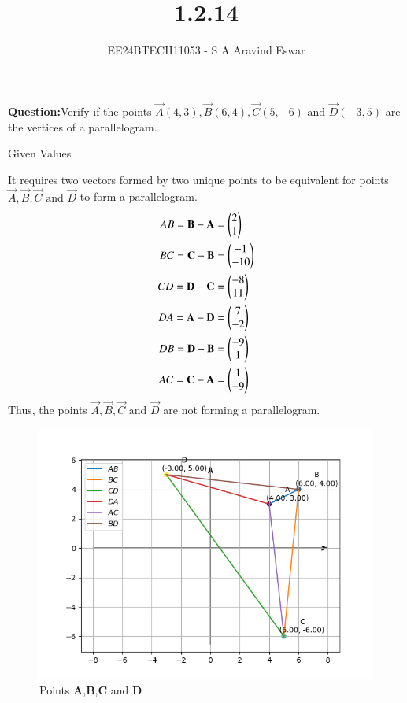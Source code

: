 \documentclass[journal]{IEEEtran}
\begin{document}

\vspace{3cm}

\title{1.2.14}
\author{EE24BTECH11053 - S A Aravind Eswar
}
{\let\newpage\relax\maketitle}

\renewcommand{\thefigure}{\theenumi}
\renewcommand{\thetable}{\theenumi}
\setlength{\intextsep}{10pt} %


\renewcommand{\thetable}{\theenumi}

\textbf{Question:}Verify if the points $\vec{A}(4, 3), \vec{B}(6, 4), \vec{C}(5, -6)\text{ and }\vec{D}(-3, 5)$ are the vertices of a
parallelogram.\\
\solution 
\begin{table}[h]
	\centering
	
	\caption{Given Values}
	\label{tab:1}
\end{table}

It requires two vectors formed by two unique points to be equivalent for points $\vec{A},\vec{B},\vec{C}\text{ and }\vec{D}$ to form a parallelogram.
\begin{align}AB = \textbf{B}-\textbf{A} &= \begin{pmatrix}2\\1\end{pmatrix}\\BC = \textbf{C}-\textbf{B} &= \begin{pmatrix}-1\\-10\end{pmatrix}\\CD =\textbf{D}-\textbf{C} &=\begin{pmatrix}-8\\11\end{pmatrix}\\DA = \textbf{A}-\textbf{D} &= \begin{pmatrix}7\\-2\end{pmatrix}\\DB = \textbf{D}-\textbf{B} &= \begin{pmatrix}-9\\1\end{pmatrix}\\AC = \textbf{C}-\textbf{A} &= \begin{pmatrix}1\\-9\end{pmatrix}\end{align}
Thus, the points $\vec{A},\vec{B},\vec{C} \text{ and }\vec{D}$ are not forming a parallelogram.


\begin{figure}[h]
    \centering
    \includegraphics[width=\columnwidth]{figs/fig1.png}
    \caption{Points \textbf{A},\textbf{B},\textbf{C} and \textbf{D}}
 \end{figure}
\end{document}
